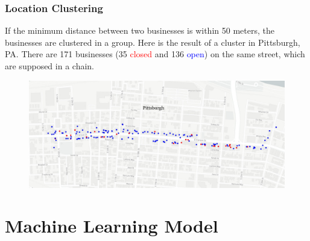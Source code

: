 \documentclass{beamer}
\begin{document}
\begin{frame}
\frametitle{Location Clustering}
If the minimum distance between two businesses is within 50 meters, the businesses are clustered in a group. Here is the result of a cluster in Pittsburgh, PA. There are 171 businesses (35 \textcolor{red}{closed} and 136 \textcolor{blue}{open}) on the same street, which are supposed in a chain. 

\begin{figure}
	\includegraphics[width=\textwidth]{Pittsburgh.jpg}
\end{figure}

\end{frame}

\section{Machine Learning Model}
\end{document}
